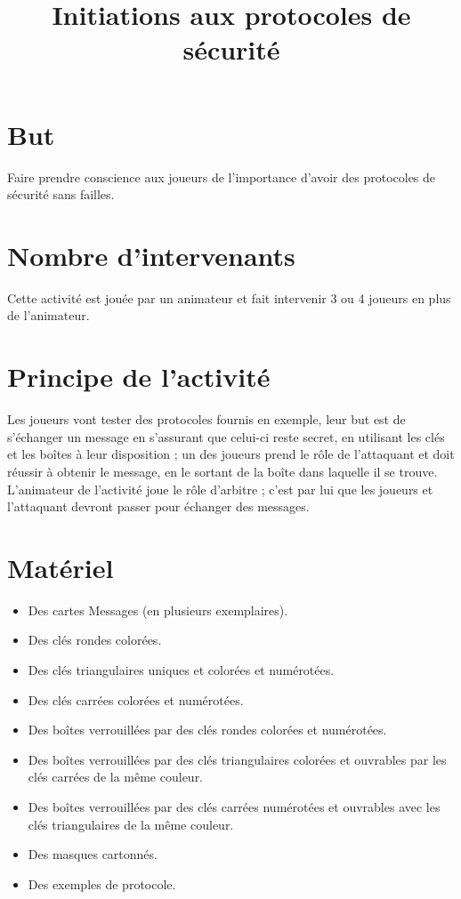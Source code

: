 \documentclass[a4paper,10pt]{article}
\title{Initiations aux protocoles de sécurité}
\begin{document}
\maketitle


\section{But}
Faire prendre conscience aux joueurs de l'importance d'avoir des protocoles de sécurité sans failles.

\section{Nombre d'intervenants}
Cette activité est jouée par un animateur et fait intervenir 3 ou 4 joueurs en plus de l'animateur.

\section{Principe de l'activité}
Les joueurs vont tester des protocoles fournis en exemple, leur but est de s'échanger un message en s'assurant que celui-ci reste secret, en utilisant les clés et les boîtes à leur disposition ; un des joueurs prend le rôle de l'attaquant et doit réussir à obtenir le message, en le sortant de la boîte dans laquelle il se trouve. L'animateur de l'activité joue le rôle d'arbitre ; c'est par lui que les joueurs et l'attaquant devront passer pour échanger des messages.

\section{Matériel}
\begin{itemize}
\item Des cartes Messages (en plusieurs exemplaires).
\item Des clés rondes colorées.
\item Des clés triangulaires uniques et colorées et numérotées.
\item Des clés carrées colorées et numérotées.
\item Des boîtes verrouillées par des clés rondes colorées et numérotées.
\item Des boîtes verrouillées par des clés triangulaires colorées et ouvrables par les clés carrées de la même couleur.
\item Des boîtes verrouillées par des clés carrées numérotées et ouvrables avec les clés triangulaires de la même couleur.
\item Des masques cartonnés.
\item Des exemples de protocole.
\end{itemize}
\end{document}
